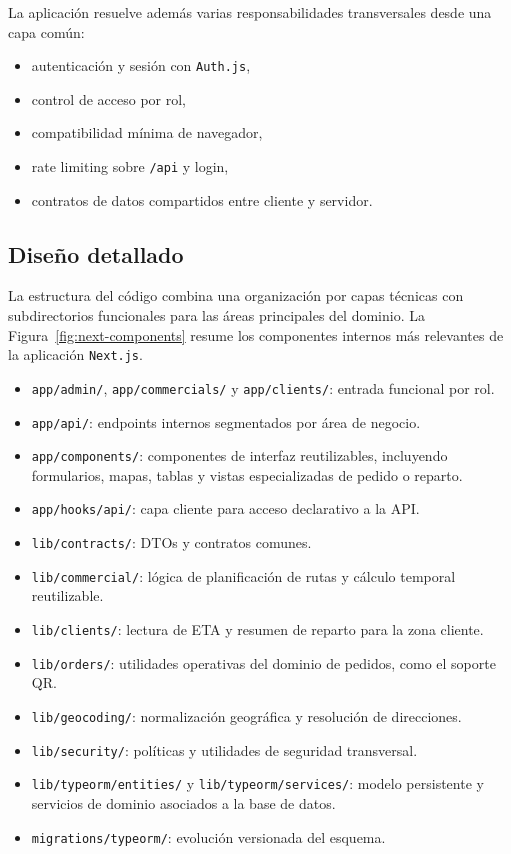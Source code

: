 La aplicación resuelve además varias responsabilidades transversales desde una capa común:

\begin{itemize}
    \item autenticación y sesión con \texttt{Auth.js},
    \item control de acceso por rol,
    \item compatibilidad mínima de navegador,
    \item rate limiting sobre \texttt{/api} y login,
    \item contratos de datos compartidos entre cliente y servidor.
\end{itemize}

\subsection{Diseño detallado}

La estructura del código combina una organización por capas técnicas con subdirectorios funcionales para las áreas principales del dominio. La Figura~\ref{fig:next-components} resume los componentes internos más relevantes de la aplicación \texttt{Next.js}.

\begin{itemize}
    \item \texttt{app/admin/}, \texttt{app/commercials/} y \texttt{app/clients/}: entrada funcional por rol.
    \item \texttt{app/api/}: endpoints internos segmentados por área de negocio.
    \item \texttt{app/components/}: componentes de interfaz reutilizables, incluyendo formularios, mapas, tablas y vistas especializadas de pedido o reparto.
    \item \texttt{app/hooks/api/}: capa cliente para acceso declarativo a la API.
    \item \texttt{lib/contracts/}: DTOs y contratos comunes.
    \item \texttt{lib/commercial/}: lógica de planificación de rutas y cálculo temporal reutilizable.
    \item \texttt{lib/clients/}: lectura de ETA y resumen de reparto para la zona cliente.
    \item \texttt{lib/orders/}: utilidades operativas del dominio de pedidos, como el soporte QR.
    \item \texttt{lib/geocoding/}: normalización geográfica y resolución de direcciones.
    \item \texttt{lib/security/}: políticas y utilidades de seguridad transversal.
    \item \texttt{lib/typeorm/entities/} y \texttt{lib/typeorm/services/}: modelo persistente y servicios de dominio asociados a la base de datos.
    \item \texttt{migrations/typeorm/}: evolución versionada del esquema.
\end{itemize}

